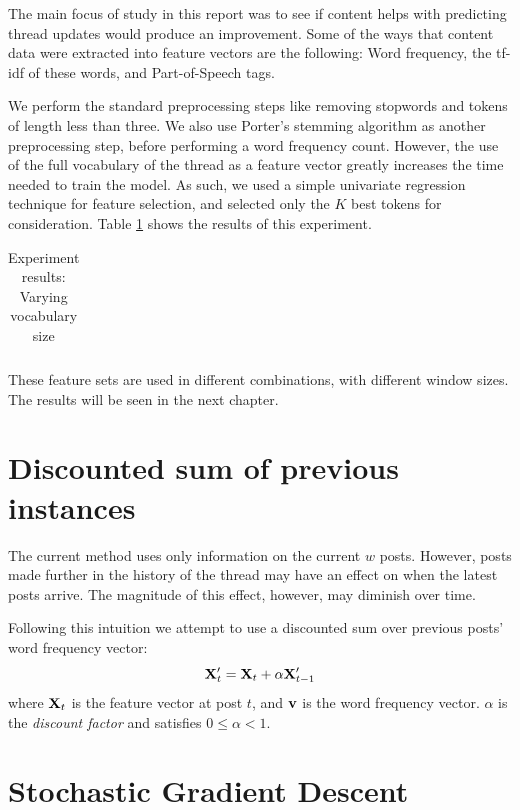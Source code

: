 The main focus of study in this report was to see if content helps with 
predicting thread updates would produce an improvement. Some of the ways that 
content data were extracted into feature vectors are the following: Word 
frequency, the tf-idf of these words, and Part-of-Speech tags.

We perform the standard preprocessing steps like removing stopwords and tokens 
of length less than three. We also use Porter's stemming algorithm as another 
preprocessing step, before performing a word frequency count. However, the use 
of the full vocabulary of the thread as a feature vector greatly increases the 
time needed to train the model. As such, we used a simple univariate regression 
technique for feature selection, and selected only the $K$ best tokens for 
consideration. Table \ref{table:vocab_exp} shows the results of this experiment.  

\begin{table}
	\footnotesize
	\begin{centering}
	\begin{tabular}{|l|c|c|c|c|c|c|c|c|}
	\hline
	
	\hline
	\end{tabular}
	\caption{Experiment results: Varying vocabulary size}
	\label{table:vocab_exp}
\end{centering}
\end{table}


These feature sets are used in different combinations, with different window 
sizes. The results will be seen in the next chapter.

\section{Discounted sum of previous instances}
The current method uses only information on the current $w$ posts. However, 
posts made further in the history of the thread may have an effect on when the 
latest posts arrive. The magnitude of this effect, however, may diminish over 
time.

Following this intuition we attempt to use a discounted sum over previous posts' 
word frequency vector:
\[
	\mathbf{X}'_t = \mathbf{X}_t + \alpha \mathbf{X}'_{t-1}
\]
where $\mathbf{X}_t$ is the feature vector at post $t$, and $\mathbf{v}$ is the word 
frequency vector. $\alpha$ is the \emph{discount factor} and satisfies $0 \leq 
\alpha < 1$.

\section{Stochastic Gradient Descent}


